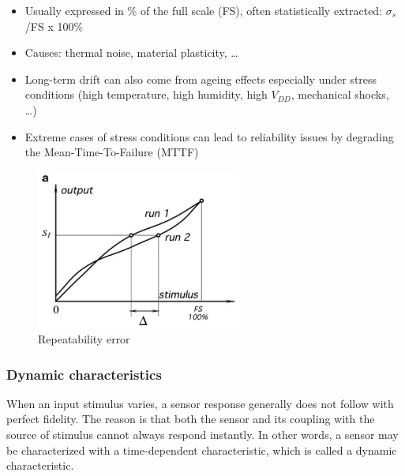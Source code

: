 \begin{minipage}{0.45 \linewidth}

\begin{itemize}
\item Usually expressed in \% of the full scale (FS), often
statistically extracted: $\sigma_s$/FS x 100\%
\item Causes: thermal noise, material plasticity, \dots
\item Long-term drift can also come from ageing effects
especially under stress conditions (high temperature,
high humidity, high $V_{DD}$, mechanical shocks, \dots)
\item Extreme cases of stress conditions can lead to
reliability issues by degrading the Mean-Time-To-Failure (MTTF)
\end{itemize}

\end{minipage}\hfill
\begin{minipage}{0.45 \linewidth}

\begin{figure}[H]
    \centering
    \includegraphics[width = 0.6\textwidth]{L1/img/repeatability.PNG}
    \caption{Repeatability error}
\end{figure}
\end{minipage}


\subsubsection{Dynamic characteristics}

When an input stimulus varies, a sensor response generally does not follow with perfect fidelity. The reason is that both the sensor and its coupling with the source of stimulus cannot always respond instantly. In other words, a sensor may be characterized with a time-dependent characteristic, which is called a dynamic characteristic.

